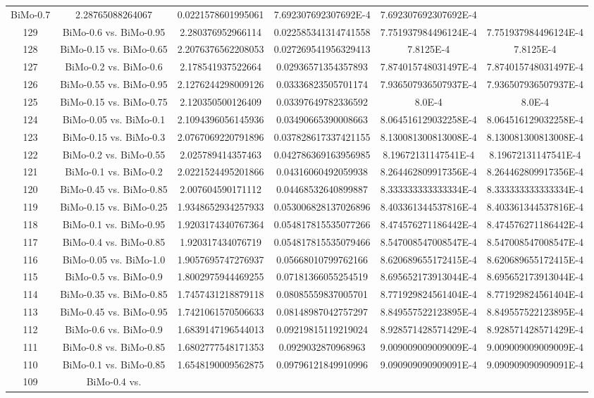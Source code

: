 \documentclass[a4paper,10pt]{article}
\begin{document}
\begin{landscape}
\begin{table}[!htp]
\begin{tabular}{cccccc}
BiMo-0.7&2.28765088264067&0.0221578601995061&7.692307692307692E-4&7.692307692307692E-4\\129&BiMo-0.6 vs. BiMo-0.95&2.280376952966114&0.022585341314741558&7.751937984496124E-4&7.751937984496124E-4\\128&BiMo-0.15 vs. BiMo-0.65&2.2076376562208053&0.027269541956329413&7.8125E-4&7.8125E-4\\127&BiMo-0.2 vs. BiMo-0.6&2.178541937522664&0.02936571354357893&7.874015748031497E-4&7.874015748031497E-4\\126&BiMo-0.55 vs. BiMo-0.95&2.1276244298009126&0.03336823505701174&7.936507936507937E-4&7.936507936507937E-4\\125&BiMo-0.15 vs. BiMo-0.75&2.120350500126409&0.03397649782336592&8.0E-4&8.0E-4\\124&BiMo-0.05 vs. BiMo-0.1&2.1094396056145936&0.03490665390008663&8.064516129032258E-4&8.064516129032258E-4\\123&BiMo-0.15 vs. BiMo-0.3&2.0767069220791896&0.037828617337421155&8.130081300813008E-4&8.130081300813008E-4\\122&BiMo-0.2 vs. BiMo-0.55&2.025789414357463&0.042786369163956985&8.19672131147541E-4&8.19672131147541E-4\\121&BiMo-0.1 vs. BiMo-0.2&2.0221524495201866&0.04316060492059938&8.264462809917356E-4&8.264462809917356E-4\\120&BiMo-0.45 vs. BiMo-0.85&2.007604590171112&0.04468532640899887&8.333333333333334E-4&8.333333333333334E-4\\119&BiMo-0.15 vs. BiMo-0.25&1.9348652934257933&0.053006828137026896&8.403361344537816E-4&8.403361344537816E-4\\118&BiMo-0.1 vs. BiMo-0.95&1.9203174340767364&0.054817815535077266&8.474576271186442E-4&8.474576271186442E-4\\117&BiMo-0.4 vs. BiMo-0.85&1.920317434076719&0.054817815535079466&8.547008547008547E-4&8.547008547008547E-4\\116&BiMo-0.05 vs. BiMo-1.0&1.9057695747276937&0.05668010799762166&8.620689655172415E-4&8.620689655172415E-4\\115&BiMo-0.5 vs. BiMo-0.9&1.8002975944469255&0.07181366055254519&8.695652173913044E-4&8.695652173913044E-4\\114&BiMo-0.35 vs. BiMo-0.85&1.7457431218879118&0.08085559837005701&8.771929824561404E-4&8.771929824561404E-4\\113&BiMo-0.45 vs. BiMo-0.95&1.7421061570506633&0.08148987042757297&8.849557522123895E-4&8.849557522123895E-4\\112&BiMo-0.6 vs. BiMo-0.9&1.6839147196544013&0.09219815119219024&8.928571428571429E-4&8.928571428571429E-4\\111&BiMo-0.8 vs. BiMo-0.85&1.6802777548171353&0.0929032870968963&9.009009009009009E-4&9.009009009009009E-4\\110&BiMo-0.1 vs. BiMo-0.85&1.6548190009562875&0.09796121849910996&9.090909090909091E-4&9.090909090909091E-4\\109&BiMo-0.4 vs. 
\end{tabular}
\end{table}
\end{landscape}
\end{document}
